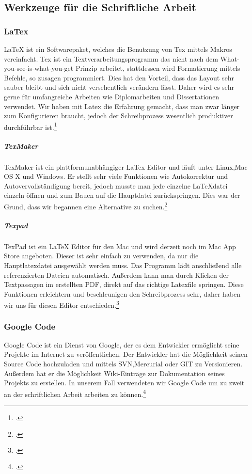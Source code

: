 \subsection{Werkzeuge für die Schriftliche Arbeit}
\subsubsection{LaTex}
LaTeX ist ein Softwarepaket, welches die Benutzung von Tex mittels Makros vereinfacht. Tex ist ein Textverarbeitungsprogramm das nicht nach dem What-you-see-is-what-you-get Prinzip arbeitet, stattdessen wird Formatierung mittels Befehle, so zusagen programmiert. Dies hat den Vorteil, dass das Layout sehr sauber bleibt und sich nicht versehentlich verändern lässt. Daher wird es sehr gerne für umfangreiche Arbeiten wie Diplomarbeiten und Dissertationen verwendet. Wir haben mit Latex die Erfahrung gemacht, dass man zwar länger zum Konfigurieren braucht, jedoch der Schreibprozess wesentlich produktiver durchführbar ist.\footcite[vgl.][]{latex}
\subparagraph{TexMaker}
TexMaker ist ein plattformunabhängiger LaTex Editor und läuft unter Linux,Mac OS X und Windows. Er stellt sehr viele Funktionen wie Autokorrektur und Autovervollständigung bereit, jedoch musste man jede einzelne 
LaTeXdatei einzeln öffnen und zum Bauen auf die Hauptdatei zurückspringen. Dies war der Grund, dass wir begannen eine Alternative zu suchen.\footcite[vgl.][]{texmaker}
\subparagraph{Texpad}
TexPad ist ein LaTeX Editor für den Mac und wird derzeit noch im Mac App Store angeboten. Dieser ist sehr einfach zu verwenden, da nur die Hauptlatexdatei ausgewählt werden muss. Das Programm lädt anschließend alle referenzierten Dateien automatisch. Außerdem kann man durch Klicken der Textpassagen im erstellten PDF, direkt auf das richtige Latexfile springen.
Diese Funktionen erleichtern und beschleunigen den Schreibprozess sehr, daher haben wir uns für diesen Editor entschieden.\footcite[vgl.][]{texpad}


 
\subsubsection{Google Code}

Google Code ist ein Dienst von Google, der es dem Entwickler ermöglicht seine Projekte im Internet zu veröffentlichen. Der Entwickler hat die Möglichkeit seinen Source Code hochzuladen und mittels SVN,Mercurial oder GIT zu Versionieren. Außerdem hat er die Möglichkeit Wiki-Einträge zur Dokumentation seines Projekts zu erstellen. In unserem Fall verwendeten wir Google Code um zu zweit an der schriftlichen Arbeit arbeiten zu können.\footcite[vgl.][]{googlecode}